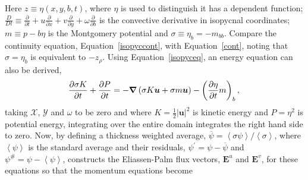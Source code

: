 \documentclass[10pt,a4paper]{report}
\newcommand*\thkmean[1]{\overline{#1}}
\newcommand*\thkres[1]{{#1}^{\prime}}
\newcommand*\nthkmean[1]{\left\langle{#1}\right\rangle}
\newcommand*\nthkres[1]{{#1}^{\#}}
\newcommand*\equref[1]{Equation~\eqref{#1}}
\newcommand*{\half}{\frac{1}{2}}
\begin{document}
                 Here $z \equiv \eta(x,y,b,t) $, where $\eta$ is used to distinguish 
                 it has a dependent function; $\frac{D}{Dt} \equiv \frac{\partial}{\partial t}
                 + u\frac{\partial}{\partial x} + v\frac{\partial}{\partial y}
                 + \omega\frac{\partial}{\partial b}$ is the
                  convective derivative in isopycnal coordinates; $m \equiv p-b\eta$ is the 
                  Montgomery potential and $\sigma \equiv \eta_{b} = -m_{bb}$.
                  Compare the continuity equation, \equref{isopyccont}, with 
                  \equref{cont}, noting that
                  $\sigma = \eta_{b}$ is equivalent to $-z_{\rho}$. Using \equref{isopyceq}, an energy equation can also be derived,
                  \begin{equation}
                  \frac{\partial \sigma K}{\partial t} + \frac{\partial P}{\partial t} = -\boldsymbol{\nabla}\left(\sigma K \boldsymbol{u} +
                  \sigma m \boldsymbol{u}\right) -\left(\frac{\partial \eta}{\partial t} m\right)_{b}, \\
                  \label{isopycenergyeq}
                  \end{equation}
                  taking $\mathcal{X}$, $\mathcal{Y}$ and $\omega$ to be zero and where $K=\half \left| \boldsymbol{u}\right|^{2}$ is kinetic energy and
                  $P=\eta^{2}$ is potential energy, integrating over the entire domain
                  integrates the right hand side to zero. 
                  Now, by defining a thickness weighted average,
                  $\thkmean{\psi}=\nthkmean{\sigma\psi}/\nthkmean{\sigma}$, where
                  $\nthkmean{\psi}$ is the standard average and their residuals,
                  $\thkres{\psi}=\psi-\thkmean{\psi}$ and $\nthkres{\psi}=\psi-\nthkmean{\psi}$,
                  \cite{young2012exact} constructs the Eliassen-Palm flux vectors, 
                  $\boldsymbol{E}^{u}$ and $\boldsymbol{E}^{v}$,  for
                  these equations so that the momentum equations become
\end{document}
